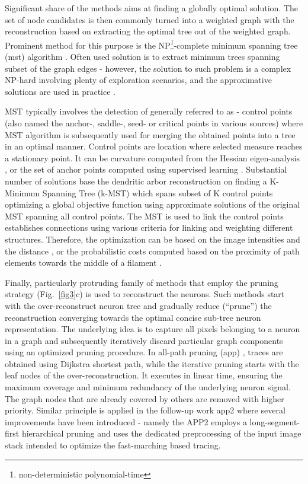 Significant share of the methods aims at finding a globally optimal solution. The set of node candidates is then commonly turned into a weighted graph with the reconstruction based on extracting the optimal tree out of the weighted graph. Prominent method for this purpose is the NP\footnote{non-deterministic polynomial-time}-complete minimum spanning tree (\gls{mst}) algorithm \cite{turetken2011automated, yuan2009mdl, gonzalez2010delineating, xie2010automatic}. Often used solution is to extract minimum trees spanning subset of the graph edges - however, the solution to such problem is a complex NP-hard \cite{chimani2009obtaining} involving plenty of exploration scenarios, and the approximative solutions are used in practice \cite{blum2005combining, gonzalez2010delineating}.

MST typically involves the detection of generally referred to as - control points (also named the anchor-, saddle-, seed- or critical points in various sources) where MST algorithm is subsequently used for merging the obtained points into a tree in an optimal manner. Control points are location where selected measure reaches a stationary point. It can be curvature computed from the Hessian eigen-analysis \cite{yuan2009mdl}, or the set of anchor points computed using supervised learning \cite{turetken2011automated}. Substantial number of solutions \cite{gonzalez2010delineating, xie2010automatic, turetken2011automated} base the dendritic arbor reconstruction on finding a K-Minimum Spanning Tree (k-MST) which spans subset of K control points optimizing a global objective function using approximate solutions of the original MST spanning all control points. The MST is used to link the control points establishes connections using various criteria for linking and weighting different structures. Therefore, the optimization can be based on the image intensities and the distance \cite{yuan2009mdl}, or the probabilistic costs computed based on the proximity of path elements towards the middle of a filament \cite{turetken2011automated}.

Finally, particularly protruding family of methods that employ the pruning strategy (Fig.~\ref{fig3}c) is used to reconstruct the neurons. Such methods start with the over-reconstruct neuron tree and gradually reduce (``prune'') the reconstruction converging towards the optimal concise sub-tree neuron representation. The underlying idea is to capture all pixels belonging to a neuron in a graph and subsequently iteratively discard particular graph components using an optimized pruning procedure. In all-path pruning (\gls{app}) \cite{peng2011automatic}, traces are obtained using Dijkstra shortest path, while the iterative pruning starts with the leaf nodes of the over-reconstruction. It executes in linear time, ensuring the maximum coverage and minimum redundancy of the underlying neuron signal. The graph nodes that are already covered by others are removed with higher priority. Similar principle is applied in the follow-up work \gls{app2} \cite{xiao2013app2} where several improvements have been introduced - namely the APP2 employs a long-segment-first hierarchical pruning and uses the dedicated preprocessing of the input image stack intended to optimize the fast-marching based tracing. 

